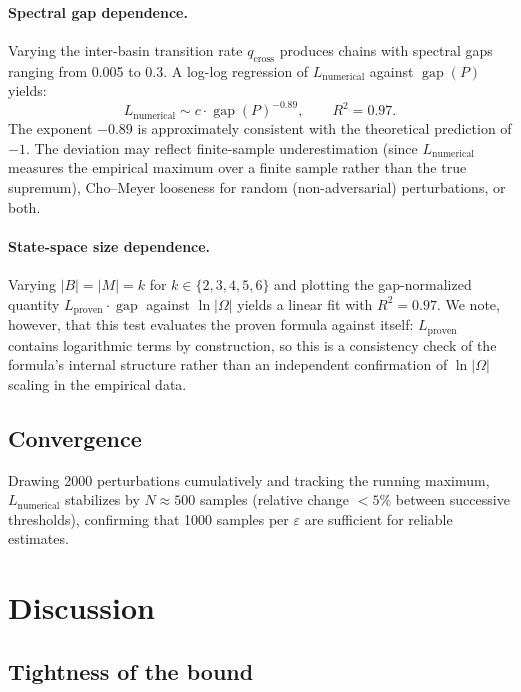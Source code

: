 \documentclass[11pt,a4paper]{article}
\DeclareMathOperator{\gap}{gap}
\begin{document}
\paragraph{Spectral gap dependence.}
Varying the inter-basin transition rate $q_{\mathrm{cross}}$ produces
chains with spectral gaps ranging from 0.005 to 0.3.  A log-log
regression of $L_{\mathrm{numerical}}$ against $\gap(P)$ yields:
\[
  L_{\mathrm{numerical}} \sim c \cdot \gap(P)^{-0.89},
  \qquad R^2 = 0.97.
\]
The exponent $-0.89$ is approximately consistent with the theoretical
prediction of $-1$.  The deviation may reflect finite-sample
underestimation (since $L_{\mathrm{numerical}}$ measures the empirical
maximum over a finite sample rather than the true supremum),
Cho--Meyer looseness for random (non-adversarial) perturbations, or both.

\paragraph{State-space size dependence.}
Varying $|B| = |M| = k$ for $k \in \{2,3,4,5,6\}$ and plotting the
gap-normalized quantity $L_{\mathrm{proven}} \cdot \gap$ against
$\ln|\Omega|$ yields a linear fit with $R^2 = 0.97$.  We note, however,
that this test evaluates the proven formula against itself: $L_{\mathrm{proven}}$
contains logarithmic terms by construction, so this is a consistency
check of the formula's internal structure rather than an independent
confirmation of $\ln|\Omega|$ scaling in the empirical data.

\subsection{Convergence}

Drawing 2000 perturbations cumulatively and tracking the running maximum,
$L_{\mathrm{numerical}}$ stabilizes by $N \approx 500$ samples
(relative change $< 5\%$ between successive thresholds), confirming
that 1000 samples per $\varepsilon$ are sufficient for reliable
estimates.


\section{Discussion}\label{sec:discussion}

\subsection{Tightness of the bound}
\end{document}
